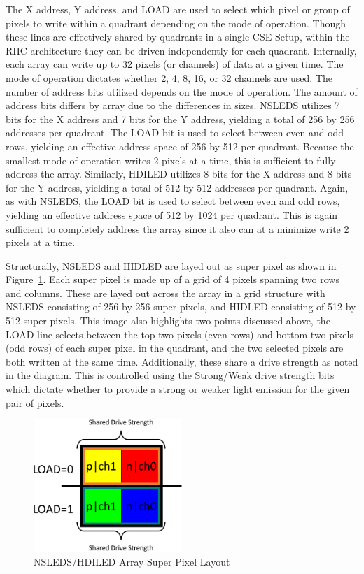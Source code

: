     The X address, Y address, and LOAD are used to select which pixel or group of pixels to write within a quadrant depending on the mode of operation. Though these lines are effectively shared by quadrants in a single CSE Setup, within the RIIC architecture they can be driven independently for each quadrant. Internally, each array can write up to 32 pixels (or channels) of data at a given time. The mode of operation dictates whether 2, 4, 8, 16, or 32 channels are used. The number of address bits utilized depends on the mode of operation. The amount of address bits differs by array due to the differences in sizes. NSLEDS utilizes 7 bits for the X address and 7 bits for the Y address, yielding a total of 256 by 256 addresses per quadrant. The LOAD bit is used to select between even and odd rows, yielding an effective address space of 256 by 512 per quadrant. Because the smallest mode of operation writes 2 pixels at a time, this is sufficient to fully address the array. Similarly, HDILED utilizes 8 bits for the X address and 8 bits for the Y address, yielding a total of 512 by 512 addresses per quadrant. Again, as with NSLEDS, the LOAD bit is used to select between even and odd rows, yielding an effective address space of 512 by 1024 per quadrant. This is again sufficient to completely address the array since it also can at a minimize write 2 pixels at a time.

    Structurally, NSLEDS and HIDLED are layed out as super pixel as shown in Figure~\ref{fig:nsleds_hdiled_array_superpixel_layout}. Each super pixel is made up of a grid of 4 pixels spanning two rows and columns. These are layed out across the array in a grid structure with NSLEDS consisting of 256 by 256 super pixels, and HIDLED consisting of 512 by 512 super pixels. This image also highlights two points discussed above, the LOAD line selects between the top two pixels (even rows) and bottom two pixels (odd rows) of each super pixel in the quadrant, and the two selected pixels are both written at the same time. Additionally, these share a drive strength as noted in the diagram. This is controlled using the Strong/Weak drive strength bits which dictate whether to provide a strong or weaker light emission for the given pair of pixels.

    \begin{figure}
        \centering
        \includegraphics[width=0.50\textwidth]{fig/superpixel_layout.pdf}
        \caption{NSLEDS/HDILED Array Super Pixel Layout}
        \label{fig:nsleds_hdiled_array_superpixel_layout}
    \end{figure}


